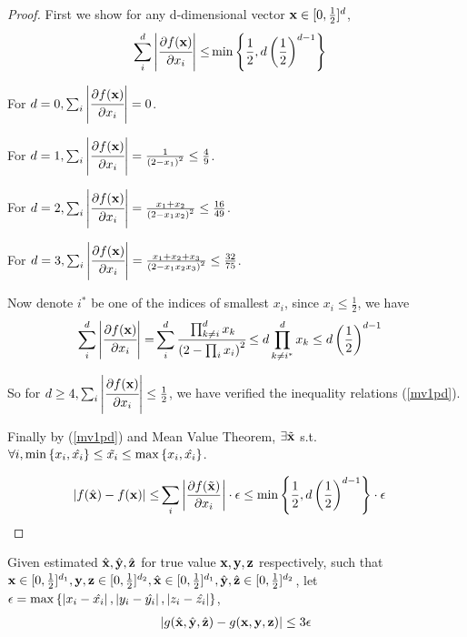 	\begin{proof}
        First we show for any d-dimensional vector ${\bf x} \in [0, \frac{1}{2}]^d$,
        \begin{align}
			\label{mv1pd}
			\sum_i^d \left\vert\cfrac{\partial f({\bf x})}{\partial x_i}\right\vert \leq & \min{\left\{\frac{1}{2}, d \left( \frac{1}{2} \right)^{d-1}\right\}}
		\end{align}

    	For $d=0, \sum_i\left\vert \cfrac{\partial f({\bf x})}{\partial x_i}\right\vert = 0$.

    	For $d=1, \sum_i\left\vert \cfrac{\partial f({\bf x})}{\partial x_i}\right\vert = \frac{1}{\left( 2 - x_1 \right)^2} \leq \frac{4}{9} $.

    	For $d=2, \sum_i\left\vert \cfrac{\partial f({\bf x})}{\partial x_i}\right\vert = \frac{x_1 + x_2}{\left( 2 - x_1x_2 \right)^2} \leq \frac{16}{49} $.

    	For $d=3, \sum_i\left\vert \cfrac{\partial f({\bf x})}{\partial x_i}\right\vert = \frac{x_1 + x_2 + x_3}{\left( 2 - x_1x_2x_3 \right)^2} \leq \frac{32}{75} $.

		Now denote $i^*$ be one of the indices of smallest $x_i$, since $x_i \leq \frac{1}{2}$, we have
    	\begin{align*}
    		\sum_i^d \left\vert\cfrac{\partial f({\bf x})}{\partial x_i}\right\vert  =& \sum_i^d \cfrac{ \prod_{k \neq i}^d x_k  }{\left( 2 - \prod_i x_i \right)^2}
    		\leq  d \prod_{k \neq i^*}^d x_k
    		\leq  d \left( \frac{1}{2} \right)^{d-1}
    	\end{align*}

		So for $d \geq 4, \sum_i \left\vert\cfrac{\partial f({\bf x})}{\partial x_i}\right\vert \leq \frac{1}{2}$, we have verified the inequality relations (\ref{mv1pd}).

		Finally by (\ref{mv1pd}) and Mean Value Theorem, $\exists \tilde{\bf x}$ s.t. $\forall i, \min\left\{x_i,\hat{x_i}\right\} \leq \tilde{x_i} \leq \max\left\{x_i, \hat{x_i}\right\}$.

		\begin{align*}
			\left\vert f(\hat{\bf x}) - f({\bf x})\right\vert \leq& \sum_i\left\vert \frac{\partial f(\tilde{\bf x})}{\partial x_i}\right\vert \cdot \epsilon
		\leq  \min{\left\{\frac{1}{2}, d \left( \frac{1}{2} \right)^{d-1}\right\}} \cdot \epsilon
		\end{align*}
	\end{proof}

	\begin{Lem}
		\label{meanvalue2}
		Given estimated $\hat{\bf x},\hat{\bf y},\hat{\bf z}$ for true value $ {\bf x}, {\bf y}, {\bf z}$ respectively, such that ${\bf x} \in [0, \frac{1}{2}]^{d_1} , {\bf y,z} \in [0, \frac{1}{2}]^{d_2}, \hat{\bf x} \in [0, \frac{1}{2}]^{d_1} , \hat{\bf y},\hat{\bf z} \in [0, \frac{1}{2}]^{d_2}$,
		let $\epsilon = \max \left\{\left\vert x_i - \hat{x_i}\right\vert, \left\vert y_i - \hat{y_i} \right\vert , \left\vert z_i - \hat{z_i}\right\vert\right\}$,
		\begin{align*}
		\left\vert g(\hat{\bf x}, \hat{\bf y}, \hat{\bf z}) - g({\bf x,y,z})\right\vert
		\leq  3\epsilon
		\end{align*}

	\end{Lem}

